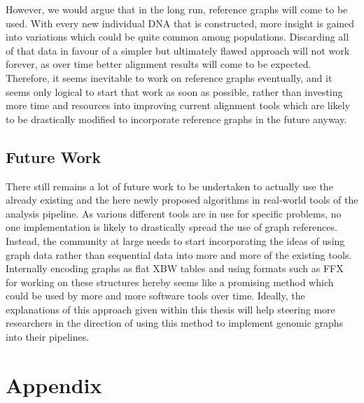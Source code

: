 \documentclass[a4paper,12pt,twoside,BCOR=10mm]{scrbook}
\begin{document}
However, we would argue that in the long run, reference graphs will come to be used.
With every new individual DNA that is constructed, more insight is gained into
variations which could be quite common among populations.
Discarding all of that data in favour of a simpler but ultimately flawed approach
will not work forever, as over time better alignment results will come to be expected. \\
Therefore, it seems inevitable to work on reference graphs eventually,
and it seems only logical to start that work as soon as possible, rather than investing
more time and resources into improving current alignment tools which are likely to be drastically
modified to incorporate reference graphs in the future anyway.

\section{Future Work}

There still remains a lot of future work to be undertaken to actually use
the already existing and the here newly proposed algorithms in real-world
tools of the analysis pipeline.
%
%
As various different tools are in use for specific problems, no one implementation
is likely to drastically spread the use of graph references.
Instead, the community at large needs to start
incorporating the ideas of using graph data rather than sequential data into
more and more of the existing tools. \\
Internally encoding graphs as flat XBW tables and using formats such as FFX for working on
these structures hereby seems like a promising method which could be used by more and
more software tools over time. Ideally, the explanations of this approach given within this
thesis will help steering more researchers in the direction of using this method to implement
genomic graphs into their pipelines.



\appendix
\renewcommand{\chaptername}{Appendix}
\chapter{Appendix}
%
\end{document}
